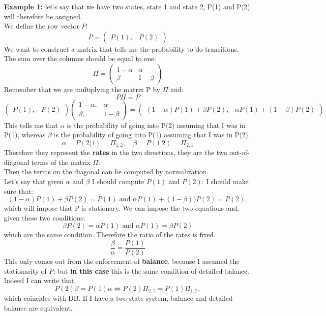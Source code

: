 \textbf{Example 1: }let's say that we have two states, state 1 and state 2, P(1) and P(2) will therefore be assigned.\\ We define the row vector $P$:
\[ P = \begin{pmatrix} P(1), & P(2) \end{pmatrix}\]
We want to construct a matrix that tells me the probability to do transitions. The sum over the columns should be equal to one:
\[
\Pi = 
\begin{pmatrix}
1-\alpha & \alpha \\
\beta & 1-\beta
\end{pmatrix}
\]
Remember that we are multiplying the matrix P by $\Pi$ and:
\[P\Pi = P\]
\[\begin{pmatrix} P(1), & P(2) \end{pmatrix}\begin{pmatrix}
1-\alpha, & \alpha \\
\beta, & 1-\beta
\end{pmatrix} = \begin{pmatrix}(1-\alpha)P(1)+\beta P(2), & \alpha P(1)+(1-\beta)P(2)\end{pmatrix}
\]
This tells me that $\alpha$ is the probability of going into P(2) assuming that I was in P(1), whereas $\beta$ is the probability of going into P(1) assuming that I was in P(2).\\
\[
\alpha = P(2|1) = \Pi_{1,2},\quad \beta = P(1|2)= \Pi_{2,1}
\]
Therefore they represent the \textbf{rates} in the two directions, they are the two out-of-diagonal terms of the matrix $\Pi$.\\
Then the terms on the diagonal can be computed by normalization.\\
Let's say that given $\alpha$ and $\beta$ I should compute $P(1)$ and $P(2)$: I should make sure that:
\[
(1-\alpha)P(1)+\beta P(2)= P(1) \text{ and } \alpha P(1)+(1-\beta))P(2)= P(2),\]
which will impose that P is stationary.
We can impose the two equations and, given these two conditions:
\[
\beta P(2) = \alpha P(1)\text{ and } \alpha P(1) =\beta P(2)
\]
which are the same condition.
Therefore the ratio of the rates is fixed.
\[
\frac{\beta}{\alpha} = \frac{P(1)}{P(2)}
\]
This only comes out from the enforcement of \textbf{balance}, because I assumed the stationarity of $P$: but \textbf{in this case} this is the same condition of detailed balance.\\
Indeed I can write that
\[
P(2)\beta = P(1)\alpha \iff P(2)\Pi_{2,1} = P(1)\Pi_{1,2},\]
which coincides with DB. If I have a two-state system, balance and detailed balance are equivalent.\\
